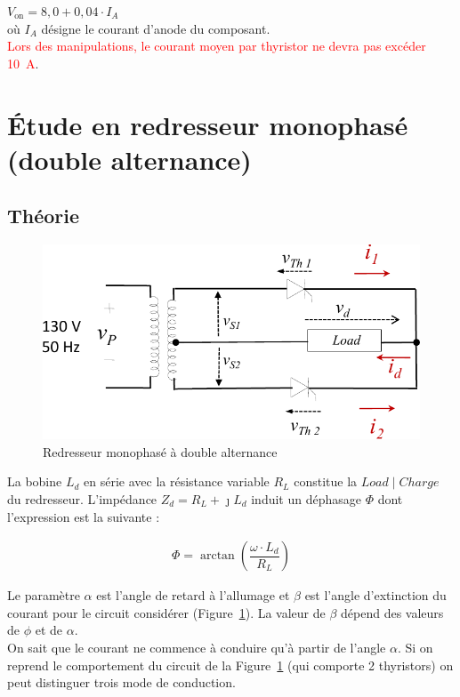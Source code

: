 \documentclass[a4paper, 11pt, openany, oneside, french]{article}
\begin{document}
$V_{\text{on}} = 8,0 + 0,04 \cdot I_A$\\

où $I_A$ désigne le courant d’anode du composant.\\

\textcolor{red}{Lors des manipulations, le courant moyen par thyristor ne devra pas excéder \SI{10}{\ampere}}.

\section{Étude en redresseur monophasé (double alternance)}

\subsection{Théorie}
\begin{figure}[!ht]
    \centering
    \includegraphics[width=0.8\linewidth]{full_wave_single_phase_retifier}
    \caption{Redresseur monophasé à double alternance}
    \label{fig:rmda}
\end{figure}
La bobine $L_d$ en série avec la résistance variable $R_{L}$ constitue la $Load\mid Charge$ du redresseur. L'impédance $Z_d=R_{L}+\jmath L_d$ induit un déphasage $\Phi$ dont l'expression est la suivante :

\begin{align}
    \Phi = \arctan{\left(\dfrac{\omega \cdot L_d}{R_L}\right)}
\end{align}

Le paramètre $\alpha$ est l'angle de retard à l'allumage et $\beta$ est l'angle d'extinction du courant pour le circuit considérer (Figure~\ref{fig:rmda}). La valeur de $\beta$ dépend des valeurs de $\phi$ et de $\alpha$.\\

On sait que le courant ne commence à conduire qu'à partir de l'angle $\alpha$. Si on reprend le comportement du circuit de la Figure~\ref{fig:rmda} (qui comporte 2 thyristors) on peut distinguer trois mode de conduction.
\end{document}
